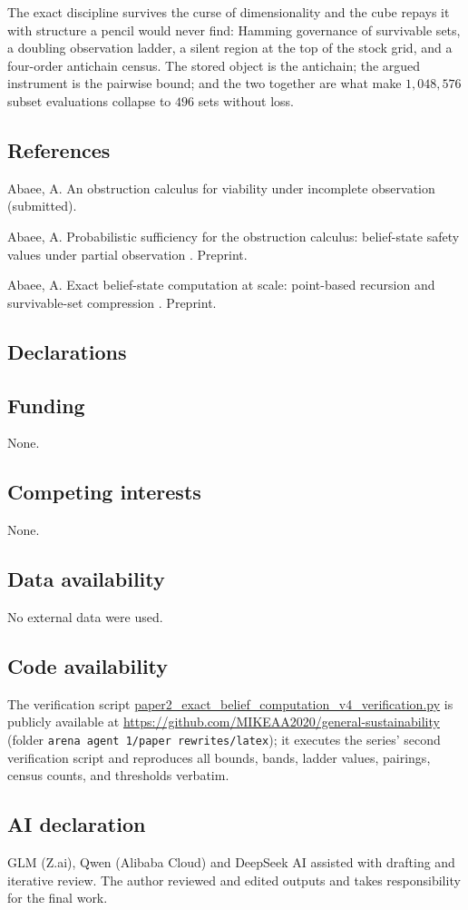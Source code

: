 \documentclass[10pt,twocolumn]{article}
\theoremstyle{plain}
\theoremstyle{definition}
\theoremstyle{remark}
\begin{document}
The exact discipline survives the curse of dimensionality and the
cube repays it with structure a pencil would never find: Hamming
governance of survivable sets, a doubling observation ladder, a
silent region at the top of the stock grid, and a four-order
antichain census. The stored object is the antichain; the argued
instrument is the pairwise bound; and the two together are what make
\(1{,}048{,}576\) subset evaluations collapse to \(496\) sets without
loss.

\subsection*{References}

{\footnotesize
Abaee, A. An obstruction calculus for viability under incomplete
observation (submitted).

Abaee, A. Probabilistic sufficiency for the obstruction calculus:
belief-state safety values under partial observation . Preprint.

Abaee, A. Exact belief-state computation at scale: point-based
recursion and survivable-set compression . Preprint.
}

\subsection*{Declarations}

\subsection*{Funding}
None.

\subsection*{Competing interests}
None.

\subsection*{Data availability}
No external data were used.

\subsection*{Code availability}
The verification script
\url{paper2_exact_belief_computation_v4_verification.py} is publicly
available at \url{https://github.com/MIKEAA2020/general-sustainability}
(folder \texttt{arena agent 1/paper rewrites/latex}); it executes the series' second verification script and reproduces all bounds, bands, ladder values, pairings,
census counts, and thresholds verbatim.

\subsection*{AI declaration}
GLM (Z.ai), Qwen (Alibaba Cloud) and DeepSeek AI assisted with drafting
and iterative review. The author reviewed and edited outputs and takes
responsibility for the final work.
\end{document}
